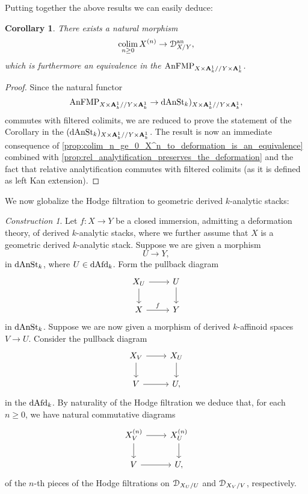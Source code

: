 \documentclass[10pt,a4paper,reqno]{amsart} %
\theoremstyle{plain}
\newtheorem{cor}[thm]{Corollary}
\theoremstyle{definition}
\theoremstyle{remark}
\numberwithin{equation}{section}
\newtheorem{construction}[thm]{Construction}
\begin{document}
Putting together the above results we can easily deduce:

\begin{cor} \label{cor:Hodge_filtration_in_the_non-archimedean_setting}
    There exists a natural morphism
        \[
            \operatorname*{colim}_{n \ge 0} X^{(n)} \to \mathcal D^\mathrm{an}_{X/ Y},  
        \]
    which is furthermore an equivalence in the \infcat $\mathrm{AnFMP}_{X \times \mathbf A^1_k/ /Y \times \mathbf A^1_k}$.
\end{cor}

\begin{proof}
    Since the natural functor
        \[
            \mathrm{AnFMP}_{X \times \mathbf A^1_k/ /Y \times \mathbf A^1_k} \to \mathrm{dAnSt}_k)_{X \times \mathbf A^1_k/ /Y \times \mathbf A^1_k},
        \]
    commutes with filtered colimits, we are reduced to prove the statement of the Corollary in the \infcat $(\mathrm{dAnSt}_k)_{X \times \mathbf A^1_k/ /Y \times \mathbf A^1_k}$.
    The result is now an immediate consequence of \cref{prop:colim_n_ge_0_X^n_to_deformation_is_an_equivalence} combined with \cref{prop:rel_analytification_preserves_the_deformation}
    and the fact that relative analytification commutes with filtered colimits (as it is defined as left Kan extension).
\end{proof}

We now globalize the Hodge filtration to geometric derived $k$-analytic stacks:

\begin{construction}
    Let $f \colon X \to Y$ be a closed immersion, admitting a deformation theory, of derived $k$-analytic stacks, where we further assume that $X$ is a geometric derived $k$-analytic stack. Suppose we are given a morphism
        \[
            U \to Y,  
        \]
    in $\mathrm{dAnSt}_k$, where $U \in \mathrm{dAfd}_k$. Form the pullback diagram
        \[
        \begin{tikzcd}
            X_U \ar{r} \ar{d} & U \ar{d} \\
            X \ar{r}{f} & Y  
        \end{tikzcd}
        \]
    in $\mathrm{dAnSt}_k$. Suppose we are now given a morphism of derived $k$-affinoid spaces $V \to U$. Consider the pullback diagram
        \[
        \begin{tikzcd}
            X_V \ar{r} \ar{d} & X_U \ar{d} \\
            V \ar{r} & U,  
        \end{tikzcd}
        \]
    in the \infcat $\mathrm{dAfd}_k$. By naturality of the Hodge filtration we deduce that, for each $n \ge 0$, we have natural commutative diagrams
        \begin{equation} \label{eq:gluing_diagram_of_Hodge_filtrations}
        \begin{tikzcd}
            X_V^{(n)} \ar{r} \ar{d} & X_U^{(n)} \ar{d} \\
            V \ar{r} & U,
        \end{tikzcd}
        \end{equation}
    of the $n$-th pieces of the Hodge filtrations on $\mathcal D_{X_U/ U}$ and $\mathcal D_{X_V/ V}$, respectively.
\end{construction}
\end{document}

